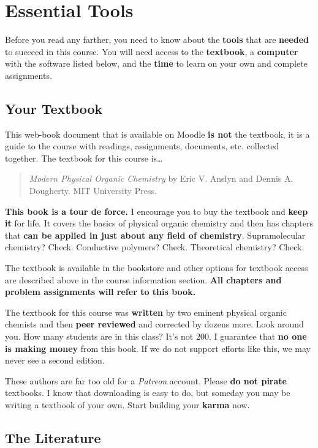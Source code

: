 \section{Essential Tools}

Before you read any farther, you need to know about the \textbf{tools} that are \textbf{needed} to succeed in this course. You will need access to the \textbf{textbook}, a \textbf{computer} with the software listed below, and the \textbf{time} to learn on your own and complete assignments.

\subsection{Your Textbook}

This web-book document that is available on Moodle \textbf{is not} the textbook, it is a guide to the course with readings, assignments, documents, etc. collected together. The textbook for this course is\ldots

\begin{quote}
\textit{Modern Physical Organic Chemistry} by Eric V. Anslyn and Dennis A. Dougherty. MIT University Press.
\end{quote}

\textbf{This book is a tour de force.} I encourage you to buy the textbook and \textbf{keep it} for life. It covers the basics of physical organic chemistry and then has chapters that \textbf{can be applied in just about any field of chemistry}. Supramolecular chemistry? Check. Conductive polymers? Check. Theoretical chemistry? Check.

The textbook is available in the bookstore and other options for textbook access are described above in the course information section. \textbf{All chapters and problem assignments will refer to this book.}

The textbook for this course was \textbf{written} by two eminent physical organic chemists and then \textbf{peer reviewed} and corrected by dozens more. Look around you. How many students are in this class? It's not 200. I guarantee that \textbf{no one is making money} from this book. If we do not support efforts like this, we may never see a second edition.

These authors are far too old for a \emph{Patreon} account. Please \textbf{do not pirate} textbooks. I know that downloading is easy to do, but someday you may be writing a textbook of your own. Start building your \textbf{karma} now.

\subsection{The Literature}


